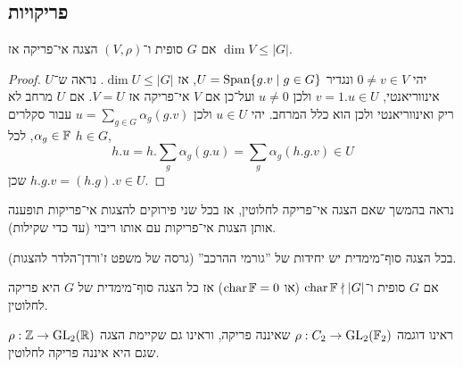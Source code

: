 \subsection{פריקויות}
\begin{proposition}
	אם $G$ סופית ו־$(V, \rho)$ הצגה אי־פריקה אז $\dim V \le |G|$.
\end{proposition}
\begin{proof}
	יהי $0 \ne v \in V$ ונגדיר $U = \operatorname{Span}\{ g . v \mid g \in G \}$, אז $\dim U \le |G|$.
	נראה ש־$U$ אינווריאנטי, $v = 1 . u \in U$ ולכן $u \ne 0$ ועל־כן אם $V$ אי־פריקה אז $V = U$.
	אם $U$ מרחב לא ריק ואינווריאנטי ולכן הוא כלל המרחב.
	יהי $u \in U$ ולכן $u = \sum_{g \in G} \alpha_g (g. v)$ עבור סקלרים $\alpha_g \in \mathbb{F}$,
	לכל $h \in G$,
	\[
		h . u
		= h . \sum_g \alpha_g (g. u)
		= \sum_g \alpha_g (h . g . v)
		\in U
	\]
	שכן $h . g . v = (h . g) . v \in U$.
\end{proof}
\begin{remark}
	נראה בהמשך שאם הצגה אי־פריקה לחלוטין, אז בכל שני פירוקים להצגות אי־פריקות תופענה אותן הצגות אי־פריקות עם אותו ריבוי (עד כדי שקילות).
\end{remark}
\begin{remark}
	בכל הצגה סוף־מימדית יש יחידות של ''גורמי ההרכב'' (גרסה של משפט ז'ורדן־הלדר להצגות).
\end{remark}
\begin{theorem}
	אם $G$ סופית ו־$\operatorname{char} \mathbb{F} \nmid |G|$ (או $\operatorname{char} \mathbb{F} = 0$) אז כל הצגה סוף־מימדית של $G$ היא פריקה לחלוטין.
\end{theorem}
ראינו דוגמה $\rho : C_2 \to \operatorname{GL}_2(\mathbb{F}_2)$ שאיננה פריקה, וראינו גם שקיימת הצגה $\rho : \mathbb{Z} \to \operatorname{GL}_2(\mathbb{R})$ שגם היא איננה פריקה לחלוטין.
